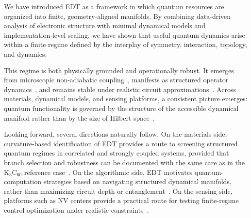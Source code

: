 We have introduced EDT as a framework in which quantum resources are organized into finite, geometry-aligned manifolds. By combining data-driven analysis of electronic structure with minimal dynamical models and implementation-level scaling, we have shown that useful quantum dynamics arise within a finite regime defined by the interplay of symmetry, interaction, topology, and dynamics.

This regime is both physically grounded and operationally robust. It emerges from microscopic non-adiabatic coupling~\cite{Mead1979,Yarkony1996}, manifests as structured operator dynamics~\cite{Swingle2018}, and remains stable under realistic circuit approximations~\cite{Lloyd1996,Childs2019}. Across materials, dynamical models, and sensing platforms, a consistent picture emerges: quantum functionality is governed by the structure of the accessible dynamical manifold rather than by the size of Hilbert space~\cite{Amico2008,Eisert2010}.

Looking forward, several directions naturally follow. On the materials side, curvature-based identification of EDT provides a route to screening structured quantum regimes in correlated and strongly coupled systems, provided that branch selection and robustness can be documented with the same care as in the K$_3$C$_{60}$ reference case~\cite{Capone2009}. On the algorithmic side, EDT motivates quantum-computation strategies based on navigating structured dynamical manifolds, rather than maximizing circuit depth or entanglement~\cite{Preskill2018}. On the sensing side, platforms such as NV centers provide a practical route for testing finite-regime control optimization under realistic constraints~\cite{Degen2017}.
